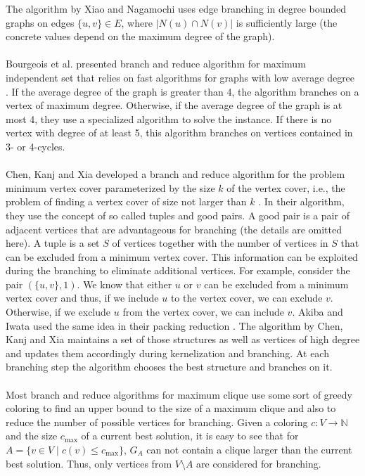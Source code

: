 \documentclass[]{article}
\begin{document}
The algorithm by Xiao and Nagamochi uses edge branching in degree bounded graphs on edges $\{u,v\}\in E$, where $|N(u)\cap N(v)|$ is sufficiently large (the concrete values depend on the maximum degree of the graph). \paragraph{}
Bourgeois et al. presented branch and reduce algorithm for maximum independent set that relies on fast algorithms for graphs with low average degree \cite{Bourgeois}. If the average degree of the graph is greater than 4, the algorithm branches on a vertex of maximum degree. Otherwise, if the average degree of the graph is at most 4, they use a specialized algorithm to solve the instance. If there is no vertex with degree of at least 5, this algorithm branches on vertices contained in 3- or 4-cycles.\paragraph{}
Chen, Kanj and Xia developed a branch and reduce algorithm for the problem minimum vertex cover parameterized by the size $k$ of the vertex cover, i.e., the problem of finding a vertex cover of size not larger than $k$ \cite{ChenXiaKanj}. In their algorithm, they use the concept of so called tuples and good pairs. A good pair is a pair of adjacent vertices that are advantageous for branching (the details are omitted here). A tuple is a set $S$ of vertices together with the number of vertices in $S$ that can be excluded from a minimum vertex cover. This information can be exploited during the branching to eliminate additional vertices. For example, consider the pair $(\{u,v\}, 1)$. We know that either $u$ or $v$ can be excluded from a minimum vertex cover and thus, if we include $u$ to the vertex cover, we can exclude $v$. Otherwise, if we exclude $u$ from the vertex cover, we can include $v$. Akiba and Iwata used the same idea in their packing reduction \cite{AkibaIwata}. The algorithm by Chen, Kanj and Xia maintains a set of those structures as well as vertices of high degree and updates them accordingly during kernelization and branching. At each branching step the algorithm chooses the best structure and branches on it.\paragraph{}
Most branch and reduce algorithms for maximum clique use some sort of greedy coloring to find an upper bound to the size of a maximum clique and also to reduce the number of possible vertices for branching. Given a coloring $c:V \rightarrow \mathbb{N}$ and the size $c_\text{max}$ of a current best solution, it is easy to see that for $A = \{v\in V \;|\; c(v)\leq c_\text{max}\}$, $G_A$ can not contain a clique larger than the current best solution. Thus, only vertices from $V\setminus A$ are considered for branching.
\end{document}
